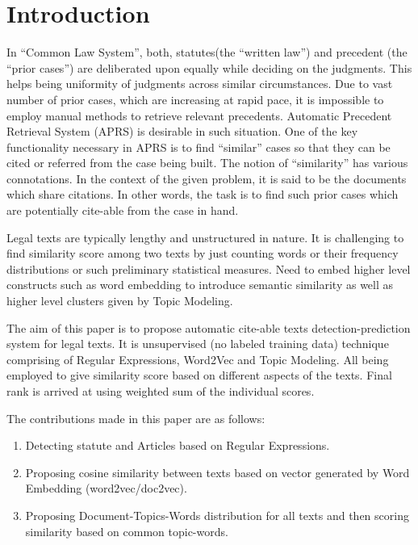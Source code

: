 \section{Introduction}\label{sec:introduction}

In ``Common Law System'', both,  statutes(the ``written law'') and  precedent (the ``prior cases'') are deliberated upon equally while deciding on the judgments. This helps being uniformity of judgments across similar circumstances. Due to vast number of prior cases, which are increasing at rapid pace, it is impossible to employ manual methods to retrieve relevant precedents. Automatic Precedent Retrieval System (APRS) is desirable in such situation. One of the key functionality necessary in APRS is to find ``similar'' cases so that they can be cited or referred from the case being built. The notion of ``similarity'' has various connotations. In the context of the given problem, it is said to be the documents which share citations. In other words, the task is to find such prior cases which are potentially cite-able from the case in hand.

Legal texts are typically lengthy and unstructured in nature. It is challenging to find similarity score among two texts by just counting words or their frequency distributions or such preliminary statistical measures. Need to embed higher level constructs such as word embedding to introduce semantic similarity as well as higher level clusters given by Topic Modeling.

The aim of this paper is to propose automatic cite-able texts detection-prediction system for legal texts. It is unsupervised (no labeled training data) technique comprising of  Regular Expressions, Word2Vec and Topic Modeling. All being employed to give similarity score based on different aspects of the texts. Final rank is arrived at using weighted sum of the individual scores.

The contributions made in this paper are as follows:

\begin{enumerate}
	\item Detecting statute and Articles based on Regular Expressions.
	\item Proposing cosine similarity between texts based on vector generated by Word Embedding (word2vec/doc2vec).
	\item Proposing Document-Topics-Words distribution for all texts and then scoring similarity based on common topic-words.
\end{enumerate}

